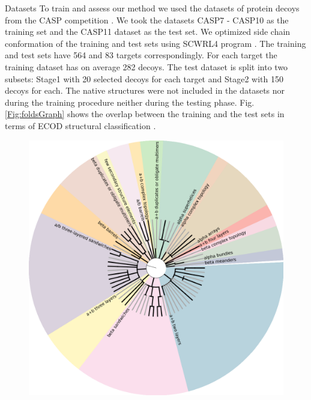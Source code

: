 \documentclass[final, unknownkeysallowed]{beamer}
\begin{document}
\begin{frame}{}
\begin{textblock}{39.0}
\begin{block}{Datasets}
   To train and assess our method we used the datasets of protein decoys from the CASP competition \cite{moult2014critical}. 
We took the datasets CASP7 - CASP10 as the training set and the CASP11 dataset as the test set.
We optimized side chain conformation of the training and test sets using SCWRL4 program \cite{krivov2009improved}.
The training and test sets have 564 and 83 targets correspondingly. For each target the training dataset has 
on average 282 decoys. The test dataset is split into two subsets: Stage1 with 20 selected decoys for each target and Stage2 with 150 decoys
for each. The native structures were not included in the datasets nor during the training procedure
neither during the testing phase. Fig. \ref{Fig:foldsGraph} shows the overlap between the training and the test sets in terms of 
ECOD structural classification \cite{cheng2014ecod}.
\begin{figure}[H]
    \centering
    \includegraphics[width=0.6\linewidth]{../draft/Fig/folds_graph.png}

\end{figure}
\end{block}
\end{textblock}
\end{frame}
\end{document}
